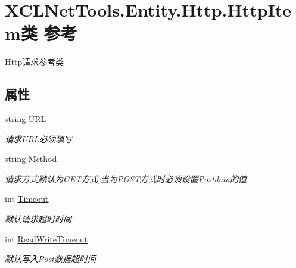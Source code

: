 \hypertarget{class_x_c_l_net_tools_1_1_entity_1_1_http_1_1_http_item}{}\section{X\+C\+L\+Net\+Tools.\+Entity.\+Http.\+Http\+Item类 参考}
\label{class_x_c_l_net_tools_1_1_entity_1_1_http_1_1_http_item}


Http请求参考类  


\subsection*{属性}
\begin{DoxyCompactItemize}
\item 
string \hyperlink{class_x_c_l_net_tools_1_1_entity_1_1_http_1_1_http_item_aaaa3a229c51a9c1dab14f61c0104b380}{U\+RL}
\begin{DoxyCompactList}\small\item\em 请求\+U\+R\+L必须填写 \end{DoxyCompactList}\item 
string \hyperlink{class_x_c_l_net_tools_1_1_entity_1_1_http_1_1_http_item_a4c675d85e9d3864e5c5ad04c4a4ae3cd}{Method}
\begin{DoxyCompactList}\small\item\em 请求方式默认为\+G\+E\+T方式,当为\+P\+O\+S\+T方式时必须设置\+Postdata的值 \end{DoxyCompactList}\item 
int \hyperlink{class_x_c_l_net_tools_1_1_entity_1_1_http_1_1_http_item_a186cca2bc3a89d6385862bdf9cdcc70d}{Timeout}
\begin{DoxyCompactList}\small\item\em 默认请求超时时间 \end{DoxyCompactList}\item 
int \hyperlink{class_x_c_l_net_tools_1_1_entity_1_1_http_1_1_http_item_adfed36da49bce477ba004f8cf224633c}{Read\+Write\+Timeout}
\begin{DoxyCompactList}\small\item\em 默认写入\+Post数据超时间 \end{DoxyCompactList}\item 

\end{DoxyCompactItemize}
